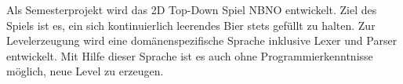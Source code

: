 Als Semesterprojekt wird das 2D Top-Down Spiel NBNO entwickelt.
Ziel des Spiels ist es, ein sich kontinuierlich leerendes Bier stets gefüllt zu halten.
Zur Levelerzeugung wird eine domänenspezifische Sprache inklusive Lexer und Parser entwickelt.
Mit Hilfe dieser Sprache ist es auch ohne Programmierkenntnisse möglich, neue Level zu erzeugen.